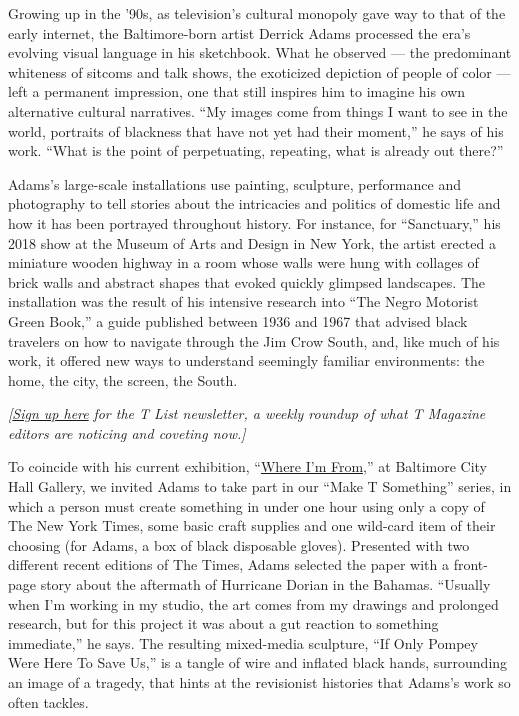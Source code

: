Growing up in the '90s, as television's cultural monopoly gave way to
that of the early internet, the Baltimore-born artist Derrick Adams
processed the era's evolving visual language in his sketchbook. What he
observed --- the predominant whiteness of sitcoms and talk shows, the
exoticized depiction of people of color --- left a permanent impression,
one that still inspires him to imagine his own alternative cultural
narratives. ``My images come from things I want to see in the world,
portraits of blackness that have not yet had their moment,'' he says of
his work. ``What is the point of perpetuating, repeating, what is
already out there?''

Adams's large-scale installations use painting, sculpture, performance
and photography to tell stories about the intricacies and politics of
domestic life and how it has been portrayed throughout history. For
instance, for ``Sanctuary,'' his 2018 show at the Museum of Arts and
Design in New York, the artist erected a miniature wooden highway in a
room whose walls were hung with collages of brick walls and abstract
shapes that evoked quickly glimpsed landscapes. The installation was the
result of his intensive research into ``The Negro Motorist Green Book,''
a guide published between 1936 and 1967 that advised black travelers on
how to navigate through the Jim Crow South, and, like much of his work,
it offered new ways to understand seemingly familiar environments: the
home, the city, the screen, the South.

\emph{{[}}\href{https://www.nytimes3xbfgragh.onion/newsletters/t-list?module=inline}{\emph{Sign
up here}} \emph{for the T List newsletter, a weekly roundup of what T
Magazine editors are noticing and coveting now.{]}}

To coincide with his current exhibition,
``\href{http://www.bmoreart.com/events/derrick-adams-where-im-from}{Where
I'm From,}'' at Baltimore City Hall Gallery, we invited Adams to take
part in our ``Make T Something'' series, in which a person must create
something in under one hour using only a copy of The New York Times,
some basic craft supplies and one wild-card item of their choosing (for
Adams, a box of black disposable gloves). Presented with two different
recent editions of The Times, Adams selected the paper with a front-page
story about the aftermath of Hurricane Dorian in the Bahamas. ``Usually
when I'm working in my studio, the art comes from my drawings and
prolonged research, but for this project it was about a gut reaction to
something immediate,'' he says. The resulting mixed-media sculpture,
``If Only Pompey Were Here To Save Us,'' is a tangle of wire and
inflated black hands, surrounding an image of a tragedy, that hints at
the revisionist histories that Adams's work so often tackles.

